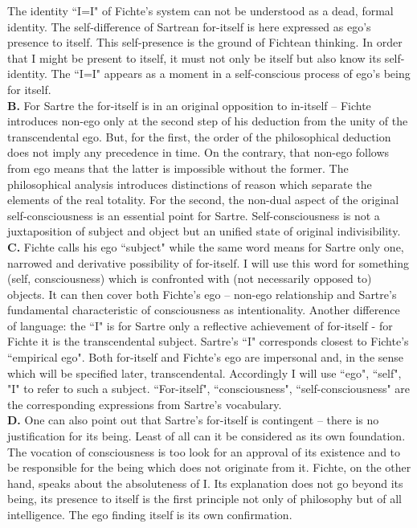 The identity ``I=I"  of Fichte's system can not be understood as a dead, formal 
identity. The self-difference of Sartrean for-itself is here expressed as ego's presence to itself. This self-presence is 
the ground of Fichtean thinking. In order that I might be present to itself, it must not only be itself but also know 
its self-identity. The ``I=I" appears as a moment in a self-conscious process of ego's being for itself. \\[1ex]
{\bf B.} For Sartre the for-itself is in an original opposition to in-itself -- Fichte introduces non-ego only at the second step 
of his deduction from the unity of the transcendental ego. But, for the first, the order of the philosophical deduction 
does not imply any precedence in time. On the contrary, that non-ego follows from ego means that the latter is 
impossible without the former. The philosophical analysis introduces distinctions of
reason which separate the elements of the real totality. For the 
second, the non-dual aspect of the original self-consciousness is an essential point for Sartre. Self-consciousness is not a juxtaposition of subject and object but an unified state 
of original indivisibility. \\[1ex]
{\bf C.} Fichte calls his ego ``subject" while the same word means for Sartre only one, narrowed and derivative 
possibility of for-itself. I will use this word for something (self, consciousness) which is confronted with (not 
necessarily opposed to) objects. It can then cover both Fichte's ego -- non-ego relationship and Sartre's fundamental 
characteristic of consciousness as intentionality.
Another difference of language: the ``I" is for Sartre only a reflective achievement of for-itself - for Fichte it is the 
transcendental subject. Sartre's ``I" corresponds closest to Fichte's ``empirical ego". Both for-itself and Fichte's ego 
are impersonal and, in the sense which will be specified later, transcendental. Accordingly I will use ``ego", ``self", 
"I" to refer to such a subject. ``For-itself", ``consciousness", ``self-consciousness" are the corresponding expressions from Sartre's vocabulary. \\[1ex]
{\bf D.} One can also point out that Sartre's for-itself is contingent -- there is no justification for its being. Least of all 
can it be considered as its own foundation. The vocation of consciousness is too look for an approval of its 
existence and to be responsible for the being which does not originate from it. Fichte, on the other hand, speaks 
about the absoluteness of I. Its explanation does not go beyond its being, its presence to itself is the first principle 
not only of philosophy but of all intelligence. The ego finding itself is its own confirmation.

